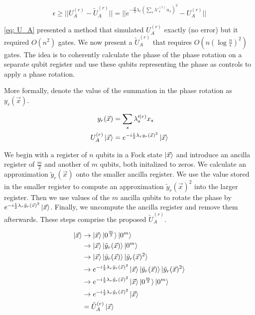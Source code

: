 \begin{equation}
    \epsilon \geq ||U_A^{(r)} - \tilde{U}_A^{(r)}|| = ||e^{-\frac{it}{2}\lambda_r\left(\sum_s \lambda'^{(r)}_s n_s\right)^2} - U_A^{(r)}|| \label{eq: error}
\end{equation}

\eqref{eq: U_A} presented a method that simulated $U_A^{(r)}$ exactly (no error) but it required $O(n^2)$ gates. We now present a $\tilde{U}_A^{(r)}$ that requires $O(n(\log{\frac{n}{\epsilon}})^2)$ gates. The idea is to coherently calculate the phase of the phase rotation on a separate qubit register and use these qubits representing the phase as controls to apply a phase rotation.

More formally, denote the value of the summation in the phase rotation as $y_r(\vec{x})$.

\begin{equation}
    \begin{split}
        y_r(\vec{x}) &= \sum_s \lambda'^{(r)}_s x_s \\
        U_A^{(r)}\ket{\vec{x}} &= e^{-i\frac{t}{2}\lambda_ry_r(\vec{x})^2}\ket{\vec{x}}
    \end{split}
\end{equation}

We begin with a register of $n$ qubits in a Fock state $\ket{\vec{x}}$ and introduce an ancilla register of $\frac{m}{2}$ and another of $m$ qubits, both initalized to zeros. We calculate an approximation $\tilde{y}_r(\vec{x})$ onto the smaller ancilla register. We use the value stored in the smaller register to compute an approximation $\tilde{y}_r(\vec{x})^2$ into the larger register. Then we use values of the $m$ ancilla qubits to rotate the phase by $e^{-i\frac{t}{2}\lambda_r\tilde{y}_r(\vec{x})^2}\ket{\vec{x}}$. Finally, we uncompute the ancilla register and remove them afterwards. These steps comprise the proposed $\tilde{U}_A^{(r)}$.

\begin{align}
    \ket{\vec{x}} &\rightarrow \ket{\vec{x}}\ket{0^{\frac{m}{2}}}\ket{0^m} \\
    &\rightarrow \ket{\vec{x}}\ket{\tilde{y}_r(\vec{x})}\ket{0^m} \label{eq: summation}\\
    &\rightarrow \ket{\vec{x}}\ket{\tilde{y}_r(\vec{x})}\ket{\tilde{y}_r(\vec{x})^2} \label{eq: squaring} \\
    &\rightarrow e^{-i\frac{t}{2}\lambda_r\tilde{y}_r(\vec{x})^2}\ket{\vec{x}}\ket{\tilde{y}_r(\vec{x})}\ket{\tilde{y}_r(\vec{x})^2} \label{eq: phase} \\
    &\rightarrow e^{-i\frac{t}{2}\lambda_r\tilde{y}_r(\vec{x})^2}\ket{\vec{x}}\ket{0^{\frac{m}{2}}}\ket{0^m} \\
    &\rightarrow e^{-i\frac{t}{2}\lambda_r\tilde{y}_r(\vec{x})^2}\ket{\vec{x}} \\
    &= \tilde{U}_A^{(r)}\ket{\vec{x}}
\end{align}

